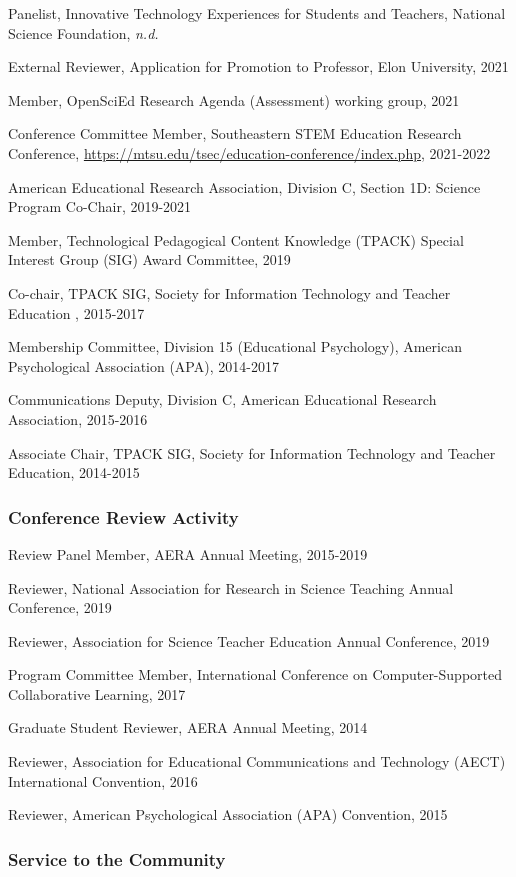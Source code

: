 \documentclass[
  14,
]{article}
\begin{document}
Panelist, Innovative Technology Experiences for Students and Teachers,
National Science Foundation, \emph{n.d.}

External Reviewer, Application for Promotion to Professor, Elon
University, 2021

Member, OpenSciEd Research Agenda (Assessment) working group, 2021

Conference Committee Member, Southeastern STEM Education Research
Conference, \url{https://mtsu.edu/tsec/education-conference/index.php},
2021-2022

American Educational Research Association, Division C, Section 1D:
Science Program Co-Chair, 2019-2021

Member, Technological Pedagogical Content Knowledge (TPACK) Special
Interest Group (SIG) Award Committee, 2019

Co-chair, TPACK SIG, Society for Information Technology and Teacher
Education , 2015-2017

Membership Committee, Division 15 (Educational Psychology), American
Psychological Association (APA), 2014-2017

Communications Deputy, Division C, American Educational Research
Association, 2015-2016

Associate Chair, TPACK SIG, Society for Information Technology and
Teacher Education, 2014-2015

\hypertarget{conference-review-activity}{%
\subsubsection{Conference Review
Activity}\label{conference-review-activity}}

Review Panel Member, AERA Annual Meeting, 2015-2019

Reviewer, National Association for Research in Science Teaching Annual
Conference, 2019

Reviewer, Association for Science Teacher Education Annual Conference,
2019

Program Committee Member, International Conference on Computer-Supported
Collaborative Learning, 2017

Graduate Student Reviewer, AERA Annual Meeting, 2014

Reviewer, Association for Educational Communications and Technology
(AECT) International Convention, 2016

Reviewer, American Psychological Association (APA) Convention, 2015

\hypertarget{service-to-the-community}{%
\subsubsection{Service to the
Community}\label{service-to-the-community}}
\end{document}
